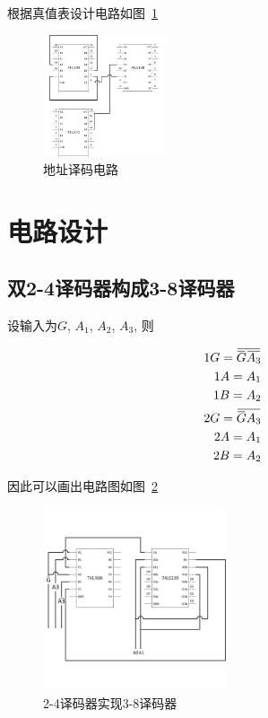 \documentclass[a4paper,twoside]{ctexart}
\newcommand{\ols}[1]{\mskip.5\thinmuskip\overline{\mskip-.5\thinmuskip {#1} \mskip-.5\thinmuskip}\mskip.5\thinmuskip}
\begin{document}
\begin{spacing}{1.2}
根据真值表设计电路如图~\ref{fig:addrdec}

\begin{figure}[H]
	\centering
	\caption{地址译码电路}
	\label{fig:addrdec}
	\includegraphics[width=0.32\textwidth]{images/33.png}
\end{figure}

\clearpage


\setcounter{section}{4}

\section{电路设计}

\subsection{双2-4译码器构成3-8译码器}

设输入为$G$, $A_1$, $A_2$, $A_3$, 则

\begin{equation}
	\begin{aligned}
		1G=\ols{\ols{G}\ols{A_3}}\\
		1A=A_1\\
		1B=A_2\\
		2G=\ols{\ols{G}A_3}\\
		2A=A_1\\
		2B=A_2\\
	\end{aligned}
\end{equation}

因此可以画出电路图如图~\ref{fig:dec24to38}

\begin{figure}[htbp]
	\centering
	\caption{2-4译码器实现3-8译码器}
	\label{fig:dec24to38}
	\includegraphics[width=0.48\textwidth]{images/41.png}
\end{figure}


\end{spacing}
\end{document}
